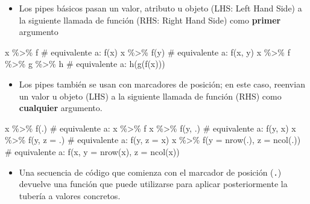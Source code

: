 \documentclass[
  letterpaper,
  DIV=11,
  numbers=noendperiod]{scrreprt}
\newenvironment{Shaded}{\begin{snugshade}}{\end{snugshade}}
\newcommand{\AttributeTok}[1]{\textcolor[rgb]{0.40,0.45,0.13}{#1}}
\newcommand{\CommentTok}[1]{\textcolor[rgb]{0.37,0.37,0.37}{#1}}
\newcommand{\FunctionTok}[1]{\textcolor[rgb]{0.28,0.35,0.67}{#1}}
\newcommand{\NormalTok}[1]{\textcolor[rgb]{0.00,0.23,0.31}{#1}}
\newcommand{\SpecialCharTok}[1]{\textcolor[rgb]{0.37,0.37,0.37}{#1}}
\providecommand{\tightlist}{%
  \setlength{\itemsep}{0pt}\setlength{\parskip}{0pt}}\usepackage{longtable,booktabs,array}
\begin{document}
\begin{itemize}
\tightlist
\item
  Los pipes básicos pasan un valor, atributo u objeto (LHS: Left Hand
  Side) a la siguiente llamada de función (RHS: Right Hand Side) como
  \textbf{primer} argumento
\end{itemize}

\begin{Shaded}
\begin{Highlighting}[]
\NormalTok{x }\SpecialCharTok{\%\textgreater{}\%}\NormalTok{ f }\CommentTok{\# equivalente a: f(x)}
\NormalTok{x }\SpecialCharTok{\%\textgreater{}\%} \FunctionTok{f}\NormalTok{(y) }\CommentTok{\# equivalente a: f(x, y)}
\NormalTok{x }\SpecialCharTok{\%\textgreater{}\%}\NormalTok{ f }\SpecialCharTok{\%\textgreater{}\%}\NormalTok{ g }\SpecialCharTok{\%\textgreater{}\%}\NormalTok{ h }\CommentTok{\# equivalente a: h(g(f(x)))}
\end{Highlighting}
\end{Shaded}

\begin{itemize}
\tightlist
\item
  Los pipes también se usan con marcadores de posición; en este caso,
  reenvian un valor u objeto (LHS) a la siguiente llamada de función
  (RHS) como \textbf{cualquier} argumento.
\end{itemize}

\begin{Shaded}
\begin{Highlighting}[]
\NormalTok{x }\SpecialCharTok{\%\textgreater{}\%} \FunctionTok{f}\NormalTok{(.) }\CommentTok{\# equivalente a: x \%\textgreater{}\% f}
\NormalTok{x }\SpecialCharTok{\%\textgreater{}\%} \FunctionTok{f}\NormalTok{(y, .) }\CommentTok{\# equivalente a: f(y, x)}
\NormalTok{x }\SpecialCharTok{\%\textgreater{}\%} \FunctionTok{f}\NormalTok{(y, }\AttributeTok{z =}\NormalTok{ .) }\CommentTok{\# equivalente a: f(y, z = x)}
\NormalTok{x }\SpecialCharTok{\%\textgreater{}\%} \FunctionTok{f}\NormalTok{(}\AttributeTok{y =} \FunctionTok{nrow}\NormalTok{(.),}
        \AttributeTok{z =} \FunctionTok{ncol}\NormalTok{(.))  }\CommentTok{\# equivalente a: f(x, y = nrow(x), z = ncol(x))}
\end{Highlighting}
\end{Shaded}

\begin{itemize}
\tightlist
\item
  Una secuencia de código que comienza con el marcador de posición
  (\texttt{.}) devuelve una función que puede utilizarse para aplicar
  posteriormente la tubería a valores concretos.
\end{itemize}
\end{document}
